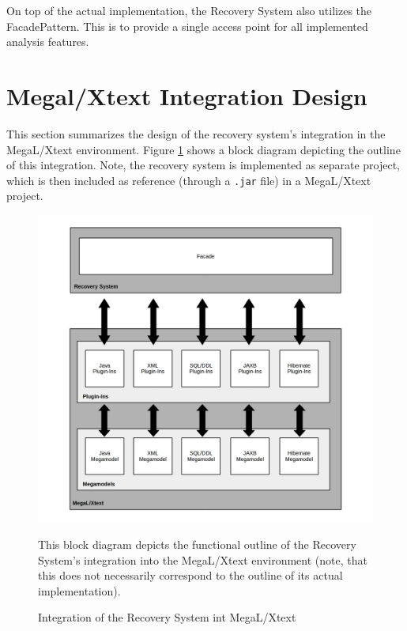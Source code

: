 On top of the actual implementation, the Recovery System also utilizes the \gls{FacadePattern}.
This is to provide a single access point for all implemented analysis features.

\section{Megal/Xtext Integration Design}
\label{section:MegalXtextIntegrationDesign}
This section summarizes the design of the recovery system's integration in the \gls{MegaL/Xtext} environment.
Figure \ref{figure:MegalXtextIntegrationDesign} shows a block diagram depicting the outline of this integration.
Note, the recovery system is implemented as separate project, which is then included as reference (through a \texttt{.jar} file) in a \gls{MegaL/Xtext} project.

\begin{figure}[h!]
\begin{center}
\includegraphics[width=\textwidth]{images/MegalXtextIntegrationDesign.png}
\end{center}
{
\scriptsize
This block diagram depicts the functional outline of the Recovery System's integration into the \gls{MegaL/Xtext} environment (note, that this does not necessarily correspond to the outline of its actual implementation).
}
\caption{Integration of the Recovery System int MegaL/Xtext}
\label{figure:MegalXtextIntegrationDesign}
\end{figure}

